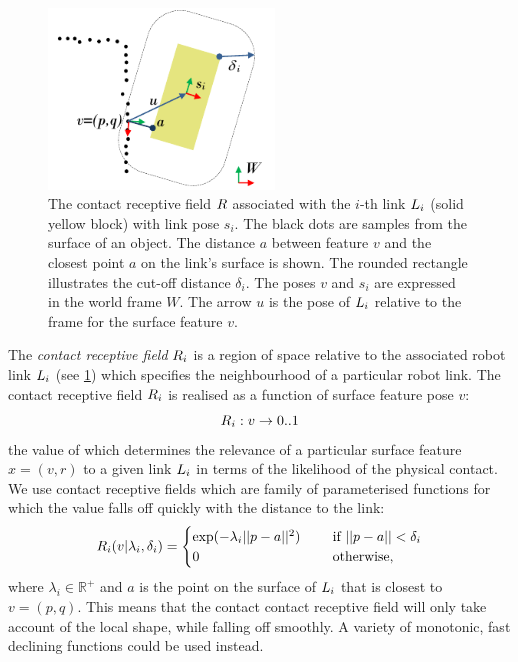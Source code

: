 \begin{figure}[t]
\centerline{\includegraphics[width=6cm]{resources/contact}}
\caption[Contact receptive field]{The contact receptive field $R$ associated with the $i$-th link $L_i$ (solid yellow block) with link pose $s_i$. The black dots are samples from the surface of an object. The distance $a$ between feature $v$ and the closest point $a$ on the link's surface is shown. The rounded rectangle illustrates the cut-off distance $\delta_i$. The poses $v$ and $s_i$ are expressed in the world frame $W$. The arrow $u$ is the pose of $L_i$ relative to the frame for the surface feature $v$.}
\label{fig:contact_recfield}
\end{figure}

The \textit{contact receptive field} $R_i$ is a region of space relative to the associated robot link $L_i$ (see \fig\ref{fig:contact_recfield}) which specifies the neighbourhood of a particular robot link. The contact receptive field $R_i$ is realised as a function of surface feature pose $v$:
\begin{equation}
R_{i} : v \rightarrow 0..1
\label{eq:contact_recfield_model}
\end{equation}
the value of which determines the relevance of a particular surface feature $x = (v, r)$ to a given link $L_i$ in terms of the likelihood of the physical contact. We use contact receptive fields which are family of parameterised functions for which the value falls off quickly with the distance to the link:
\begin{equation}
R_{i}(v|\lambda_i,\delta_i) = \begin{cases}\exp(-\lambda_i ||p-a||^2) \quad &\textnormal{ if } ||p-a|| < \delta_i\\
0 \quad &\textnormal{ otherwise},\end{cases}
\label{eq:contact_recfield_func}
\end{equation}
where $\lambda_i \in \mathbb R^{+}$ and $a$ is the point on the surface of $L_i$ that is closest to $v = (p, q)$. This means that the contact contact receptive field will only take account of the local shape, while falling off smoothly. A variety of monotonic, fast declining functions could be used instead.


